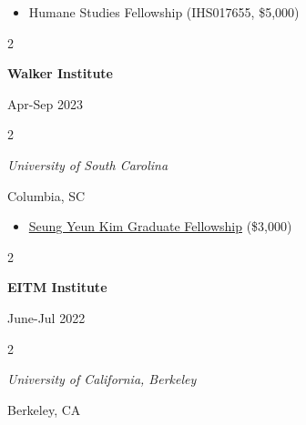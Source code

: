 \documentclass[
  16,
]{article}
\providecommand{\tightlist}{%
  \setlength{\itemsep}{0pt}\setlength{\parskip}{0pt}}
\begin{document}
\begin{itemize}
\tightlist
\item
  Humane Studies Fellowship (IHS017655, \$5,000)
\end{itemize}

\vspace{7pt}

\begin{large}
  \begin{multicols}{2}
    \begin{flushleft}{\bf Walker Institute}\end{flushleft}
    \begin{flushright}Apr-Sep 2023\end{flushright}
  \end{multicols}
  \vspace{-0.17cm}
  \begin{multicols}{2}
    \begin{flushleft}\textit{University of South Carolina}\end
    {flushleft}\begin{flushright}Columbia, SC\end
    {flushright}
  \end{multicols}
\end{large}
\vspace{-0.16cm}

\begin{itemize}
\tightlist
\item
  \href{https://sc.edu/study/colleges_schools/artsandsciences/walker_institute/research/student_scholarships_and_grants/index.php}{Seung Yeun Kim Graduate Fellowship}
  (\$3,000)
\end{itemize}

\vspace{7pt}

\begin{large}
  \begin{multicols}{2}
    \begin{flushleft}{\bf EITM Institute}\end{flushleft}
    \begin{flushright}June-Jul 2022\end{flushright}
  \end{multicols}
  \vspace{-0.17cm}
  \begin{multicols}{2}
    \begin{flushleft}\textit{University of California, Berkeley}\end
    {flushleft}\begin{flushright}Berkeley, CA\end
    {flushright}
  \end{multicols}
\end{large}
\vspace{-0.16cm}
\end{document}
